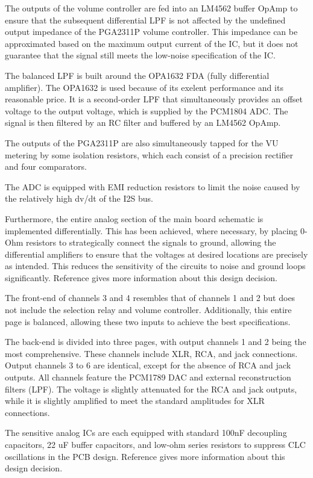 The outputs of the volume controller are fed into an LM4562 buffer OpAmp to ensure that the subsequent differential LPF is not affected by the undefined output impedance of the PGA2311P volume controller. This impedance can be approximated based on the maximum output current of the IC, but it does not guarantee that the signal still meets the low-noise specification of the IC.

The balanced LPF is built around the OPA1632 FDA (fully differential amplifier). The OPA1632 is used because of its exelent performance and its reasonable price. It is a second-order LPF that simultaneously provides an offset voltage to the output voltage, which is supplied by the PCM1804 ADC. The signal is then filtered by an RC filter and buffered by an LM4562 OpAmp.

The outputs of the PGA2311P are also simultaneously tapped for the VU metering by some isolation resistors, which each consist of a precision rectifier and four comparators.

The ADC is equipped with EMI reduction resistors to limit the noise caused by the relatively high dv/dt of the I2S bus.

Furthermore, the entire analog section of the main board schematic is implemented differentially. This has been achieved, where necessary, by placing 0-Ohm resistors to strategically connect the signals to ground, allowing the differential amplifiers to ensure that the voltages at desired locations are precisely as intended. 
This reduces the sensitivity of the circuits to noise and ground loops significantly. Reference \cite{putzeys} gives more information about this design decision.

The front-end of channels 3 and 4 resembles that of channels 1 and 2 but does not include the selection relay and volume controller. Additionally, this entire page is balanced, allowing these two inputs to achieve the best specifications.

The back-end is divided into three pages, with output channels 1 and 2 being the most comprehensive. These channels include XLR, RCA, and jack connections. Output channels 3 to 6 are identical, except for the absence of RCA and jack outputs. All channels feature the PCM1789 DAC and external reconstruction filters (LPF). The voltage is slightly attenuated for the RCA and jack outputs, while it is slightly amplified to meet the standard amplitudes for XLR connections.

The sensitive analog ICs are each equipped with standard 100nF decoupling capacitors, 22 uF buffer capacitors, and low-ohm series resistors to suppress CLC oscillations in the PCB design. Reference \cite{Supply_decoupling} gives more information about this design decision.

